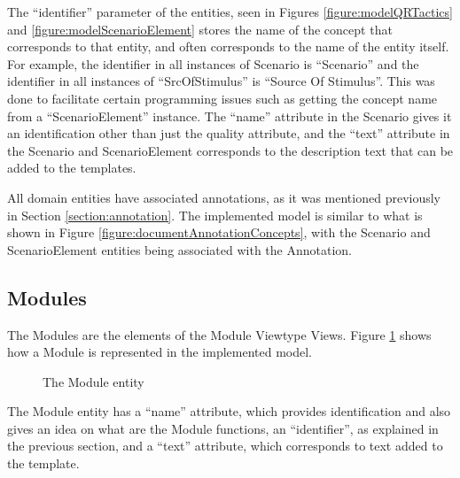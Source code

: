 The ``identifier'' parameter of the entities, seen in  Figures \ref{figure:modelQRTactics} and \ref{figure:modelScenarioElement} stores the name of the concept that corresponds to that entity, and often corresponds to the name of the entity itself. For example, the identifier in all instances of Scenario is ``Scenario'' and the identifier in all instances of ``SrcOfStimulus'' is ``Source Of Stimulus''. This was done to facilitate certain programming issues such as getting the concept name from a ``ScenarioElement'' instance. The ``name'' attribute in the Scenario gives it an identification other than just the quality attribute, and the ``text'' attribute in the Scenario and ScenarioElement corresponds to the description text that can be added to the templates.

All domain entities have associated annotations, as it was mentioned previously in Section \ref{section:annotation}. The implemented model is similar to what is shown in Figure \ref{figure:documentAnnotationConcepts}, with the Scenario and ScenarioElement entities being associated with the Annotation.


\subsection{Modules}
\label{subsection:modules}

The Modules are the elements of the Module Viewtype Views. Figure \ref{figure:modelModule} shows how a Module is represented in the implemented model.

\begin{figure}[h]
\centering
\renewcommand {\umltextcolor}{black}
\renewcommand {\umlfillcolor}{none}
\renewcommand {\umldrawcolor}{black}

\caption{The Module entity}
\label{figure:modelModule}
\end{figure}

The Module entity has a ``name'' attribute, which provides identification and also gives an idea on what are the Module functions, an ``identifier'', as explained in the previous section, and a ``text'' attribute, which corresponds to text added to the template.

